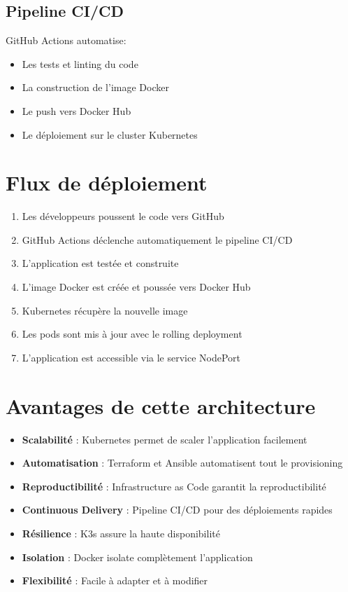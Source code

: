 \documentclass[12pt,a4paper,twoside]{report}
\begin{document}
\subsection{Pipeline CI/CD}
GitHub Actions automatise:
\begin{itemize}
    \item Les tests et linting du code
    \item La construction de l'image Docker
    \item Le push vers Docker Hub
    \item Le déploiement sur le cluster Kubernetes
\end{itemize}

\section{Flux de déploiement}

\begin{enumerate}
    \item Les développeurs poussent le code vers GitHub
    \item GitHub Actions déclenche automatiquement le pipeline CI/CD
    \item L'application est testée et construite
    \item L'image Docker est créée et poussée vers Docker Hub
    \item Kubernetes récupère la nouvelle image
    \item Les pods sont mis à jour avec le rolling deployment
    \item L'application est accessible via le service NodePort
\end{enumerate}

\section{Avantages de cette architecture}

\begin{itemize}
    \item \textbf{Scalabilité} : Kubernetes permet de scaler l'application facilement
    \item \textbf{Automatisation} : Terraform et Ansible automatisent tout le provisioning
    \item \textbf{Reproductibilité} : Infrastructure as Code garantit la reproductibilité
    \item \textbf{Continuous Delivery} : Pipeline CI/CD pour des déploiements rapides
    \item \textbf{Résilience} : K3s assure la haute disponibilité
    \item \textbf{Isolation} : Docker isolate complètement l'application
    \item \textbf{Flexibilité} : Facile à adapter et à modifier
\end{itemize}
\end{document}
